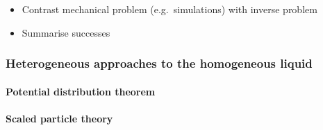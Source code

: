 \begin{itemize}
\item Contrast mechanical problem (e.g.\ simulations) with inverse problem
\item Summarise successes
\end{itemize}

\subsubsection{Heterogeneous approaches to the homogeneous liquid}
\paragraph{Potential distribution theorem}
\paragraph{Scaled particle theory}
